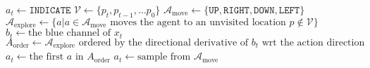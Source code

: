 \begin{algorithmic}
        \State \(a_t \leftarrow \mathtt{INDICATE}\)
    \Else
        \State \(\mathcal{V} \leftarrow \{p_t, p_{t-1}, \dots p_0\}\)
        \State \(\mathcal{A}_{\text{move}} \leftarrow \{\mathtt{UP}, \mathtt{RIGHT}, \mathtt{DOWN}, \mathtt{LEFT}\}\)
        \State \(\mathcal{A}_{\text{explore}} \leftarrow \{a | a \in \mathcal{A}_{\text{move}} \text{ moves the agent to an unvisited location } p \notin \mathcal{V}\}\) 
            \State \(b_t \leftarrow \text{the blue channel of } x_t\)
            \State \(A_{\text{order}} \leftarrow \mathcal{A}_{\text{explore}} \text{ ordered by the directional derivative of } b_t \text{ wrt the action direction}\)
            \State \(a_t \leftarrow \text{the first } a \text{ in } A_{\text{order}}\)
        \Else
            \State \(a_t \leftarrow \text{sample from } \mathcal{A}_{\text{move}}\)
        \EndIf
    \EndIf
\end{algorithmic}